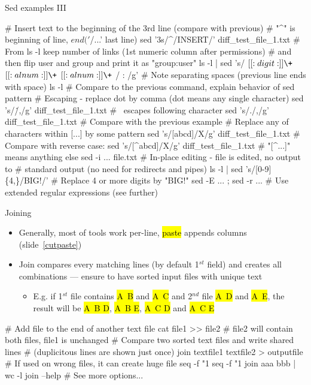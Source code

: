 \documentclass[compress, ucs, xelatex, 11pt, xcolor=svgnames, aspectratio=169,
	hyperref={
		bookmarks=true,
		unicode=true,
		colorlinks=true,
		pdftitle={Linux, command line and MetaCentrum},
		plainpages=false,
		pdfauthor={Vojtech Zeisek},
		pdfsubject={Course about use of Linux command line, writing shell scripts and using MetaCentrum of CESNET},
		pdfcreator={XeLaTeX},
		pdfkeywords={Linux, GNU, BASH, shell, command line, MetaCentrum},
		linkcolor=DarkRed, %
		anchorcolor=DarkBlue, %
		citecolor=Indigo, %
		filecolor=NavyBlue, %
		menucolor=DarkMagenta, %
		urlcolor=DarkBlue, %
		pdftex},
	url={hyphens, lowtilde} %
	]{beamer}
\renewcommand{\texttt}[1]{\hl{\ttfamily #1}}
\begin{document}
\begin{frame}[fragile]{Sed examples III}
	\begin{bashcode}
    # Insert text to the beginning of the 3rd line (compare with previous)
    # "^" is beginning of line, $ end ('$/...' last line)
    sed '3s/^/INSERT/' diff_test_file_1.txt
    # From ls -l keep number of links (1st numeric column after permissions)
    # and then flip user and group and print it as "group:user"
    ls -l | sed 's/ \([[:digit:]]\+\) \([[:alnum:]]\+\) \([[:alnum:]]\+\) /
      \1 \3:\2 /g' # Note separating spaces (previous line ends with space)
    ls -l # Compare to the previous command, explain behavior of sed pattern
    # Escaping - replace dot by comma (dot means any single character)
    sed 's/\./,/g' diff_test_file_1.txt # \ escapes following character
    sed 's/./,/g' diff_test_file_1.txt # Compare with the previous example
    # Replace any of characters within [...] by some pattern
    sed 's/[abcd]/X/g' diff_test_file_1.txt # Compare with reverse case:
    sed 's/[^abcd]/X/g' diff_test_file_1.txt # "[^...]" means anything else
    sed -i ... file.txt # In-place editing - file is edited, no output to
                        # standard output (no need for redirects and pipes)
    ls -l | sed 's/[0-9]\{4,\}/BIG!/' # Replace 4 or more digits by "BIG!"
    sed -E ... ; sed -r ... # Use extended regular expressions (see further)
	\end{bashcode}
\end{frame}

\begin{frame}[fragile]{Joining}
	\begin{itemize}
		\item Generally, most of tools work per-line, \texttt{paste} appends columns (slide~\ref{cutpaste})
		\item Join compares every matching lines (by default 1$^{st}$ field) and creates all combinations --- ensure to have sorted input files with unique text
		\begin{itemize}
			\item E.g. if 1$^{st}$ file contains \texttt{A~B} and \texttt{A~C} and 2$^{nd}$ file \texttt{A~D} and \texttt{A~E}, the result will be \texttt{A~B D}, \texttt{A~B E}, \texttt{A~C D} and \texttt{A~C E}
		\end{itemize}
	\end{itemize}
	\vfill
	\begin{bashcode}
    # Add file to the end of another text file
    cat file1 >> file2 # file2 will contain both files, file1 is unchanged
    # Compare two sorted text files and write shared lines
    # (duplicitous lines are shown just once)
    join textfile1 textfile2 > outputfile
    # If used on wrong files, it can create huge file
    seq -f "1 %
    seq -f "1 %
    join aaa bbb | wc -l
    join --help # See more options...
	\end{bashcode}
	\vfill
\end{frame}
\end{document}
